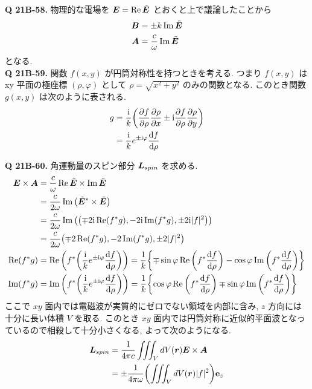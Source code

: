 \documentclass[uplatex,a4paper,dvipdfmx]{jsarticle}
\theoremstyle{definition}
\begin{document}
\textbf{Q 21B-58.}
物理的な電場を $\vb*{E} = \Re\tilde{\vb*{E}}$ とおくと上で議論したことから
\begin{align}
  \vb*{B} & = \pm k\Im\tilde{\vb*{E}} \label{B tilde E} \\
  \vb*{A} & = \frac{c}{\omega}\Im\tilde{\vb*{E}}
\end{align}
となる. \\

\textbf{Q 21B-59.}
関数 $f(x,y)$ が円筒対称性を持つときを考える. つまり $f(x,y)$ は xy 平面の極座標 $(\rho, \varphi)$ として $\rho=\sqrt{x^2 + y^2}$ のみの関数となる. このとき関数 $g(x,y)$ は次のように表される.
\begin{align}
  g & = \frac{\mathrm{i}}{k}\qty(\pdv{f}{\rho}\pdv{\rho}{x}\pm\mathrm{i}\pdv{f}{\rho}\pdv{\rho}{y}) \\
    & = \frac{\mathrm{i}}{k}e^{\pm\mathrm{i}\varphi}\dv{f}{\rho} \label{def g}
\end{align}

\textbf{Q 21B-60.}
角運動量のスピン部分 $\vb*{L}_{spin}$ を求める.
\begin{align}
  \vb*{E} \times \vb*{A} & = \frac{c}{\omega}\Re\tilde{\vb*{E}}\times\Im\tilde{\vb*{E}}                                                                                                                           \\
                 & = \frac{c}{2\omega}\Im\qty(\tilde{\vb*{E}}^*\times\tilde{\vb*{E}})                                                                                                                     \\
                 & = \frac{c}{2\omega}\Im\qty(\qty(\mp 2\mathrm{i}\Re(f^*g), -2\mathrm{i}\Im(f^*g), \pm 2\mathrm{i}|f|^2))                                                                             \\
                 & = \frac{c}{2\omega}\qty(\mp 2\Re(f^*g), -2\Im(f^*g), \pm 2|f|^2)                                                                                               \\
  \Re(f^*g)      & = \Re\qty(f^*\qty(\frac{\mathrm{i}}{k}e^{\pm\mathrm{i}\varphi}\dv{f}{\rho})) = \frac{1}{k}\qty{\mp\sin\varphi\Re\qty(f^*\dv{f}{\rho}) - \cos\varphi\Im\qty(f^*\dv{f}{\rho})} \\
  \Im(f^*g)      & = \Im\qty(f^*\qty(\frac{\mathrm{i}}{k}e^{\pm\mathrm{i}\varphi}\dv{f}{\rho})) = \frac{1}{k}\qty{\cos\varphi\Re\qty(f^*\dv{f}{\rho}) \mp \sin\varphi\Im\qty(f^*\dv{f}{\rho})}
\end{align}
ここで $xy$ 面内では電磁波が実質的にゼロでない領域を内部に含み, $z$ 方向には十分に長い体積 $V$ を取る. このとき $xy$ 面内では円筒対称に近似的平面波となっているので相殺して十分小さくなる, よって次のようになる.
\begin{align}
  \vb*{L}_{spin} & = \frac{1}{4\pi c}\iiint_V dV(\vb*{r})\vb*{E}\times\vb*{A}               \\
             & = \pm\frac{1}{4\pi\omega}\qty(\iiint_V dV(\vb*{r})|f|^2)\vb{e}_z
\end{align}
\end{document}
